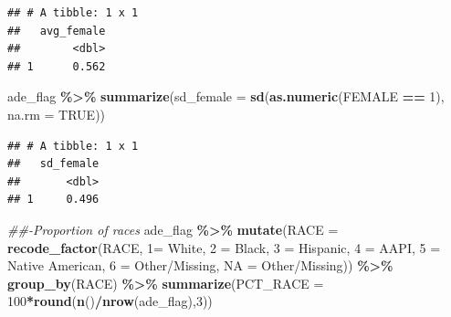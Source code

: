 \documentclass[preprint, 3p,
authoryear]{elsarticle} %
\newenvironment{Shaded}{\begin{snugshade}}{\end{snugshade}}
\newcommand{\CommentTok}[1]{\textcolor[rgb]{0.56,0.35,0.01}{\textit{#1}}}
\newcommand{\DataTypeTok}[1]{\textcolor[rgb]{0.13,0.29,0.53}{#1}}
\newcommand{\DecValTok}[1]{\textcolor[rgb]{0.00,0.00,0.81}{#1}}
\newcommand{\KeywordTok}[1]{\textcolor[rgb]{0.13,0.29,0.53}{\textbf{#1}}}
\newcommand{\NormalTok}[1]{#1}
\newcommand{\OperatorTok}[1]{\textcolor[rgb]{0.81,0.36,0.00}{\textbf{#1}}}
\newcommand{\OtherTok}[1]{\textcolor[rgb]{0.56,0.35,0.01}{#1}}
\newcommand{\StringTok}[1]{\textcolor[rgb]{0.31,0.60,0.02}{#1}}
\begin{document}
\begin{verbatim}
## # A tibble: 1 x 1
##   avg_female
##        <dbl>
## 1      0.562
\end{verbatim}

\begin{Shaded}
\begin{Highlighting}[]
\NormalTok{ade\_flag }\OperatorTok{\%\textgreater{}\%}
\StringTok{    }\KeywordTok{summarize}\NormalTok{(}\DataTypeTok{sd\_female =} \KeywordTok{sd}\NormalTok{(}\KeywordTok{as.numeric}\NormalTok{(FEMALE }\OperatorTok{==}\StringTok{ }\DecValTok{1}\NormalTok{), }\DataTypeTok{na.rm =} \OtherTok{TRUE}\NormalTok{))}
\end{Highlighting}
\end{Shaded}

\begin{verbatim}
## # A tibble: 1 x 1
##   sd_female
##       <dbl>
## 1     0.496
\end{verbatim}

\begin{Shaded}
\begin{Highlighting}[]
\CommentTok{\#\#{-}Proportion of races }
\NormalTok{ade\_flag }\OperatorTok{\%\textgreater{}\%}
\StringTok{    }\KeywordTok{mutate}\NormalTok{(}\DataTypeTok{RACE =} \KeywordTok{recode\_factor}\NormalTok{(RACE, }\StringTok{\textasciigrave{}}\DataTypeTok{1}\StringTok{\textasciigrave{}}\NormalTok{=}\StringTok{ \textquotesingle{}White\textquotesingle{}}\NormalTok{,}
                                                            \StringTok{\textasciigrave{}}\DataTypeTok{2}\StringTok{\textasciigrave{}}\NormalTok{ =}\StringTok{ \textquotesingle{}Black\textquotesingle{}}\NormalTok{,}
                                                            \StringTok{\textasciigrave{}}\DataTypeTok{3}\StringTok{\textasciigrave{}}\NormalTok{ =}\StringTok{ \textquotesingle{}Hispanic\textquotesingle{}}\NormalTok{,}
                                                            \StringTok{\textasciigrave{}}\DataTypeTok{4}\StringTok{\textasciigrave{}}\NormalTok{ =}\StringTok{ \textquotesingle{}AAPI\textquotesingle{}}\NormalTok{,}
                                                            \StringTok{\textasciigrave{}}\DataTypeTok{5}\StringTok{\textasciigrave{}}\NormalTok{ =}\StringTok{ \textquotesingle{}Native American\textquotesingle{}}\NormalTok{,}
                                                            \StringTok{\textasciigrave{}}\DataTypeTok{6}\StringTok{\textasciigrave{}}\NormalTok{ =}\StringTok{ \textquotesingle{}Other/Missing\textquotesingle{}}\NormalTok{,}
                                                            \StringTok{\textasciigrave{}}\DataTypeTok{NA}\StringTok{\textasciigrave{}}\NormalTok{ =}\StringTok{ \textquotesingle{}Other/Missing\textquotesingle{}}\NormalTok{)) }\OperatorTok{\%\textgreater{}\%}
\StringTok{    }\KeywordTok{group\_by}\NormalTok{(RACE) }\OperatorTok{\%\textgreater{}\%}
\StringTok{    }\KeywordTok{summarize}\NormalTok{(}\DataTypeTok{PCT\_RACE =} \DecValTok{100}\OperatorTok{*}\KeywordTok{round}\NormalTok{(}\KeywordTok{n}\NormalTok{()}\OperatorTok{/}\KeywordTok{nrow}\NormalTok{(ade\_flag),}\DecValTok{3}\NormalTok{))}
\end{Highlighting}
\end{Shaded}
\end{document}
